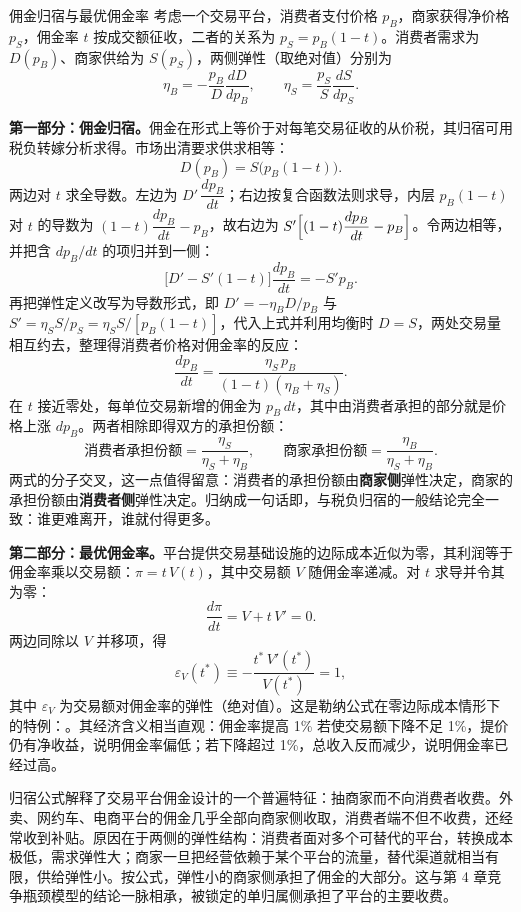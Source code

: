 \begin{derivation}{佣金归宿与最优佣金率}{}
考虑一个交易平台，消费者支付价格 $p_B$，商家获得净价格 $p_S$，佣金率 $t$ 按成交额征收，二者的关系为 $p_S = p_B(1-t)$。消费者需求为 $D(p_B)$、商家供给为 $S(p_S)$，两侧弹性（取绝对值）分别为
\[
\eta_B = -\frac{p_B}{D}\frac{dD}{dp_B}, \qquad \eta_S = \frac{p_S}{S}\frac{dS}{dp_S}.
\]

\textbf{第一部分：佣金归宿。}佣金在形式上等价于对每笔交易征收的从价税，其归宿可用税负转嫁分析求得。市场出清要求供求相等：
\[
D(p_B) = S\bigl(p_B(1-t)\bigr).
\]
两边对 $t$ 求全导数。左边为 $D'\,\dfrac{dp_B}{dt}$；右边按复合函数法则求导，内层 $p_B(1-t)$ 对 $t$ 的导数为 $(1-t)\dfrac{dp_B}{dt} - p_B$，故右边为 $S'\Bigl[(1-t)\dfrac{dp_B}{dt} - p_B\Bigr]$。令两边相等，并把含 $dp_B/dt$ 的项归并到一侧：
\[
\bigl[D' - S'(1-t)\bigr]\frac{dp_B}{dt} = -S' p_B.
\]
再把弹性定义改写为导数形式，即 $D' = -\eta_B D/p_B$ 与 $S' = \eta_S S/p_S = \eta_S S/[p_B(1-t)]$，代入上式并利用均衡时 $D = S$，两处交易量相互约去，整理得消费者价格对佣金率的反应：
\[
\frac{dp_B}{dt} = \frac{\eta_S\, p_B}{(1-t)(\eta_B + \eta_S)}.
\]
在 $t$ 接近零处，每单位交易新增的佣金为 $p_B\,dt$，其中由消费者承担的部分就是价格上涨 $dp_B$。两者相除即得双方的承担份额：
\[
\text{消费者承担份额} = \frac{\eta_S}{\eta_S + \eta_B}, \qquad
\text{商家承担份额} = \frac{\eta_B}{\eta_S + \eta_B}.
\]
两式的分子交叉，这一点值得留意：消费者的承担份额由\textbf{商家侧}弹性决定，商家的承担份额由\textbf{消费者侧}弹性决定。归纳成一句话即，与税负归宿的一般结论完全一致：谁更难离开，谁就付得更多。

\textbf{第二部分：最优佣金率。}平台提供交易基础设施的边际成本近似为零，其利润等于佣金率乘以交易额：$\pi = t\,V(t)$，其中交易额 $V$ 随佣金率递减。对 $t$ 求导并令其为零：
\[
\frac{d\pi}{dt} = V + t\,V' = 0.
\]
两边同除以 $V$ 并移项，得
\[
\varepsilon_V(t^*) \equiv -\frac{t^*\,V'(t^*)}{V(t^*)} = 1,
\]
其中 $\varepsilon_V$ 为交易额对佣金率的弹性（绝对值）。这是勒纳公式在零边际成本情形下的特例：。其经济含义相当直观：佣金率提高 1\% 若使交易额下降不足 1\%，提价仍有净收益，说明佣金率偏低；若下降超过 1\%，总收入反而减少，说明佣金率已经过高。
\end{derivation}

归宿公式解释了交易平台佣金设计的一个普遍特征：抽商家而不向消费者收费。外卖、网约车、电商平台的佣金几乎全部向商家侧收取，消费者端不但不收费，还经常收到补贴。原因在于两侧的弹性结构：消费者面对多个可替代的平台，转换成本极低，需求弹性大；商家一旦把经营依赖于某个平台的流量，替代渠道就相当有限，供给弹性小。按公式，弹性小的商家侧承担了佣金的大部分。这与第 4 章竞争瓶颈模型的结论一脉相承，被锁定的单归属侧承担了平台的主要收费。

